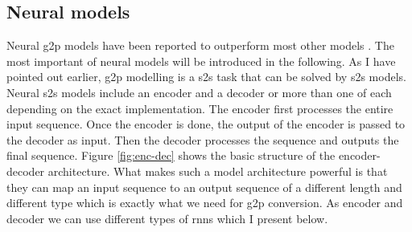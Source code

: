 
\subsection{Neural models}
Neural \ac{g2p} models have been reported to outperform most other models \citep{Lee&Ashby.2020}. The most important of neural models will be introduced in the following. As I have pointed out earlier, \ac{g2p} modelling is a \ac{s2s} task that can be solved by \ac{s2s} models. Neural \ac{s2s} models include an encoder and a decoder or more than one of each depending on the exact implementation. The encoder first processes the entire input sequence. Once the encoder is done, the output of the encoder is passed to the decoder as input. Then the decoder processes the sequence and outputs the final sequence. Figure \ref{fig:enc-dec} shows the basic structure of the encoder-decoder architecture. What makes such a model architecture powerful is that they can map an input sequence to an output sequence of a different length and different type which is exactly what we need for \ac{g2p} conversion. As encoder and decoder we can use different types of \acp{rnn} which I present below.


